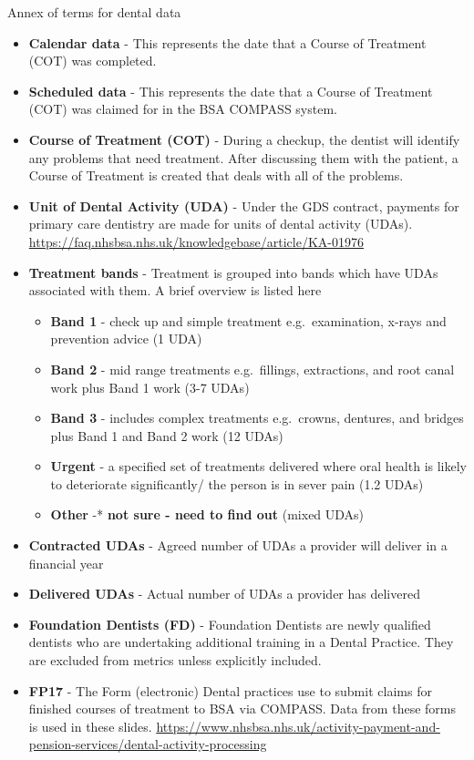 \documentclass[
  8pt,
  ignorenonframetext,
  aspectratio = 169]{beamer}
\providecommand{\tightlist}{%
  \setlength{\itemsep}{0pt}\setlength{\parskip}{0pt}}
\begin{document}
\begin{frame}{Annex of terms for dental data}
\protect\hypertarget{annex-of-terms-for-dental-data}{}
\begin{itemize}
\tightlist
\item
  \textbf{Calendar data} - This represents the date that a Course of
  Treatment (COT) was completed.
\item
  \textbf{Scheduled data} - This represents the date that a Course of
  Treatment (COT) was claimed for in the BSA COMPASS system.
\item
  \textbf{Course of Treatment (COT)} - During a checkup, the dentist
  will identify any problems that need treatment. After discussing them
  with the patient, a Course of Treatment is created that deals with all
  of the problems.
\item
  \textbf{Unit of Dental Activity (UDA)} - Under the GDS contract,
  payments for primary care dentistry are made for units of dental
  activity (UDAs).
  \url{https://faq.nhsbsa.nhs.uk/knowledgebase/article/KA-01976}
\item
  \textbf{Treatment bands} - Treatment is grouped into bands which have
  UDAs associated with them. A brief overview is listed here

  \begin{itemize}
  \tightlist
  \item
    \textbf{Band 1} - check up and simple treatment e.g.~examination,
    x-rays and prevention advice (1 UDA)
  \item
    \textbf{Band 2} - mid range treatments e.g.~fillings, extractions,
    and root canal work plus Band 1 work (3-7 UDAs)
  \item
    \textbf{Band 3} - includes complex treatments e.g.~crowns, dentures,
    and bridges plus Band 1 and Band 2 work (12 UDAs)
  \item
    \textbf{Urgent} - a specified set of treatments delivered where oral
    health is likely to deteriorate significantly/ the person is in
    sever pain (1.2 UDAs)
  \item
    \textbf{Other} -* \textbf{not sure - need to find out} (mixed UDAs)
  \end{itemize}
\item
  \textbf{Contracted UDAs} - Agreed number of UDAs a provider will
  deliver in a financial year
\item
  \textbf{Delivered UDAs} - Actual number of UDAs a provider has
  delivered
\item
  \textbf{Foundation Dentists (FD)} - Foundation Dentists are newly
  qualified dentists who are undertaking additional training in a Dental
  Practice. They are excluded from metrics unless explicitly included.
\item
  \textbf{FP17} - The Form (electronic) Dental practices use to submit
  claims for finished courses of treatment to BSA via COMPASS. Data from
  these forms is used in these slides.
  \url{https://www.nhsbsa.nhs.uk/activity-payment-and-pension-services/dental-activity-processing}
\end{itemize}


\end{frame}
\end{document}
